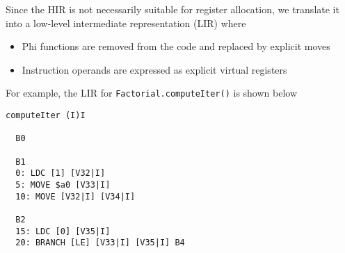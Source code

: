 \documentclass[8pt,a4paper,compress]{beamer}
\begin{document}
\begin{frame}[fragile]
\pause

Since the HIR is not necessarily suitable for register allocation, we translate it into a low-level intermediate representation (LIR) where

\begin{itemize}
\item Phi functions are removed from the code and replaced by explicit moves

\item Instruction operands are expressed as explicit virtual registers
\end{itemize}

\pause
\bigskip

For example, the LIR for \lstinline{Factorial.computeIter()} is shown below

\begin{lstlisting}[language={},style=focusin]
computeIter (I)I

  B0

  B1
  0: LDC [1] [V32|I]
  5: MOVE $a0 [V33|I]                                                                                                                                                                                                                         
  10: MOVE [V32|I] [V34|I]                                                                                                                                                                                                                    
                                                                                                                                                                                                                                              
  B2                                                                                                                                                                                                                                          
  15: LDC [0] [V35|I]                                                                                                                                                                                                                         
  20: BRANCH [LE] [V33|I] [V35|I] B4                                                                                                                                                                                                          
                                                                                                                                                                                                                                              

\end{lstlisting}
\end{frame}
\end{document}

